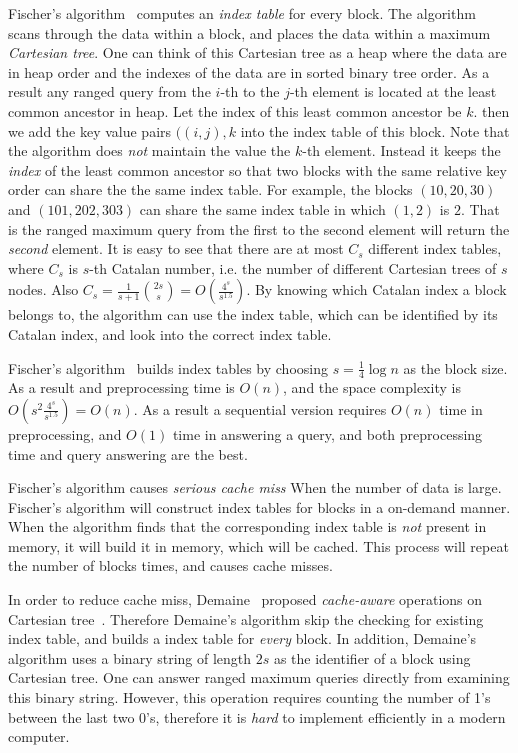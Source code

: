 Fischer's algorithm~\cite{Fischer2006TheoreticalAP} computes an {\em
  index table} for every block.  The algorithm scans through the data
within a block, and places the data within a maximum {\em Cartesian
  tree}.  One can think of this Cartesian tree as a heap where the
data are in heap order and the indexes of the data are in sorted
binary tree order.  As a result any ranged query from the $i$-th to
the $j$-th element is located at the least common ancestor in heap.
Let the index of this least common ancestor be $k$. then we add the
key value pairs $((i, j), k$ into the index table of this block.  Note
that the algorithm does {\em not} maintain the value the $k$-th
element.  Instead it keeps the {\em index} of the least common
ancestor so that two blocks with the same relative key order can share
the the same index table.  For example, the blocks $(10, 20, 30)$ and
$(101, 202, 303)$ can share the same index table in which $(1, 2)$ is
$2$.  That is the ranged maximum query from the first to the second
element will return the {\em second} element.  It is easy to see that
there are at most $C_s$ different index tables, where $C_s$ is $s$-th
Catalan number, i.e. the number of different Cartesian trees of $s$
nodes.  Also $C_s = \frac{1}{s+1}\binom{2s}{s} =
O(\frac{4^s}{s^{1.5}})$.  By knowing which Catalan index a block
belongs to, the algorithm can use the index table, which can be
identified by its Catalan index, and look into the correct index
table.

Fischer's algorithm~\cite{Fischer2006TheoreticalAP} builds index
tables by choosing $s = \frac{1}{4} \log n$ as the block size.  As a
result and preprocessing time is $O(n)$, and the space complexity is
$O(s^2 \frac{4^s}{s^{1.5}}) = O(n)$.  As a result a sequential version
requires $O(n)$ time in preprocessing, and $O(1)$ time in answering a
query, and both preprocessing time and query answering are the best.

Fischer's algorithm causes {\em serious cache miss} When the number of
data is large.  Fischer's algorithm will construct index tables for
blocks in a on-demand manner.  When the algorithm finds that the
corresponding index table is {\em not} present in memory, it will
build it in memory, which will be cached.  This process will repeat
the number of blocks times, and causes cache misses.

In order to reduce cache miss, Demaine~\cite{Demaine2009OnCT} proposed
{\em cache-aware} operations on Cartesian
tree~\cite{Vuillemin1980AUL}.  Therefore Demaine's algorithm skip the
checking for existing index table, and builds a index table for {\em
  every} block.  In addition, Demaine's algorithm uses a binary string
of length $2s$ as the identifier of a block using Cartesian tree.  One
can answer ranged maximum queries directly from examining this binary
string.  However, this operation requires counting the number of 1's
between the last two 0's, therefore it is {\em hard} to implement
efficiently in a modern computer.


